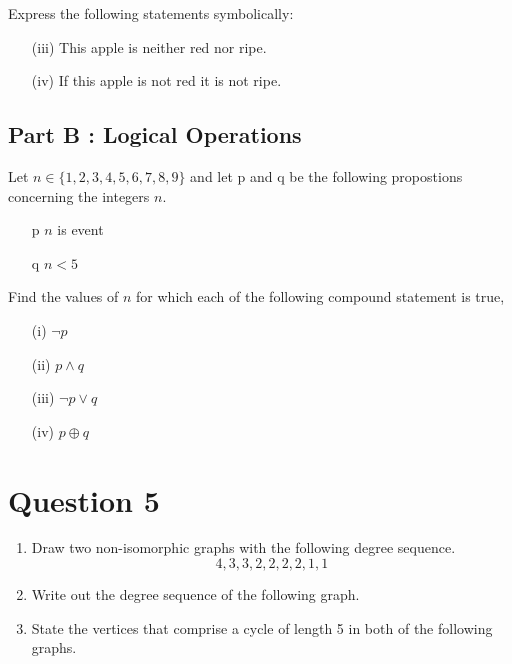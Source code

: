 \documentclass[12pt]{report}
\begin{document}
\noindent Express the following statements symbolically:
\begin{itemize}
\item[(iii)] This apple is neither red nor ripe.
\item[(iv)] If this apple is not red it is not ripe.
\end{itemize}

\subsection*{Part B : Logical Operations}
Let $n \in \{1,2,3,4,5,6,7,8,9\}$ and let p and q be the following propostions concerning 
the integers $n$.

\begin{itemize}
\item[p] $n$ is event
\item[q] $n<5$
\end{itemize}

Find the values of $n$ for which each of the following compound statement is true,

\begin{itemize}
\item[(i)] $\neg p$
\item[(ii)] $p \wedge q$
\item[(iii)] $\neg p \vee q$ 
\item[(iv)] $p \oplus q$
\end{itemize}

\newpage
\section*{Question 5}
\begin{enumerate}
\item Draw two non-isomorphic graphs with the following degree sequence.
\[ 4,3,3,2,2,2,2,1,1\]
\item Write out the degree sequence of the following graph.
\item State the vertices that comprise a cycle of length 5 in both of the following graphs.
%
\end{enumerate}
\newpage
\end{document}
